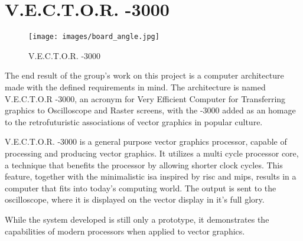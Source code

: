 \chapter{V.E.C.T.O.R. -3000}

\begin{figure}[H]
    \centering \texttt{[image: images/board\_angle.jpg]}
    \caption{V.E.C.T.O.R. -3000}
    \label{fig:board-angle}
\end{figure}

The end result of the group's work on this project is a computer architecture made with the defined requirements in mind.
The architecture is named V.E.C.T.O.R -3000, an acronym for Very Efficient Computer for Transferring graphics to Oscilloscope and Raster screens, with the -3000 added as an homage to the retrofuturistic associations of vector graphics in popular culture.

V.E.C.T.O.R. -3000 is a general purpose vector graphics processor, capable of processing and producing vector graphics. 
It utilizes a multi cycle processor core, a technique that benefits the processor by allowing shorter clock cycles.
This feature, together with the minimalistic \gls{isa} inspired by \gls{risc}\cite{risc} and \gls{mips}\cite{mips}, results in a computer that fits into today's computing world.
The output is sent to the oscilloscope, where it is displayed on the vector display in it's full glory.

While the system developed is still only a prototype, it demonstrates the capabilities of modern processors when applied to vector graphics. 



